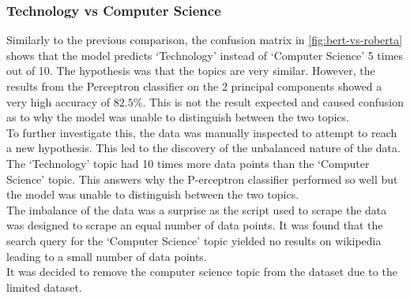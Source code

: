 \subsubsection{Technology vs Computer Science}
Similarly to the previous comparison, the confusion matrix in \cref{fig:bert-vs-roberta} shows that the model predicts `Technology'
instead of `Computer Science' 5 times out of 10. The hypothesis was that the topics are very similar. However, the results from the 
Perceptron classifier on the 2 principal components showed a very high accuracy of $82.5\%$. This is not the result expected and caused
confusion as to why the model was unable to distinguish between the two topics.\\
To further investigate this, the data was manually inspected to attempt to reach a new hypothesis. This led to the discovery of the 
unbalanced nature of the data. The `Technology' topic had 10 times more data points than the `Computer Science' topic. This answers why
the P-erceptron classifier performed so well but the model was unable to distinguish between the two topics.\\
The imbalance of the data was a surprise as the script used to scrape the data was designed to scrape an equal number of data points.
It was found that the search query for the `Computer Science' topic yielded no results on wikipedia leading to a small number of data
points.\\
It was decided to remove the computer science topic from the dataset due to the limited dataset.
